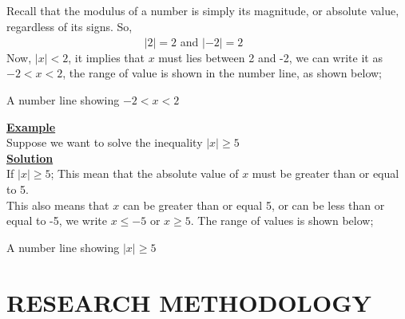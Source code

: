\documentclass[12pt]{report}
\newcommand{\ubt}[1]{\textbf{\underline{#1}}}
\newcommand{\NI}{\noindent}
\begin{document}
	\NI Recall that the modulus of a number is simply its magnitude, or absolute value, regardless of its signs. So,\\
		$\left.\right.\qquad\qquad\qquad\qquad\qquad\qquad$ $|2|=2$ and $|-2|=2$\\
		
	\NI Now, $|x|<2$, it implies that $x$ must lies between 2 and -2, we can write it as $-2<x<2$, the range of value is shown in the number line, as shown below;
	\begin{center}
		A number line showing $-2 < x < 2$\\
	\end{center}
	\ubt{Example}\\
	Suppose we want to solve the inequality $|x|\geq 5$\\
	
	\NI\ubt{Solution}\\
	If $|x| \geq 5$; This mean that the absolute value of $x$ must be greater than or equal to 5.\\
	
	\NI This also means that $x$ can be greater than or equal 5, or can be less than or equal to -5, we write $x\leq -5$ or $x\geq 5$. The range of values is shown below;
	\begin{center}
		A number line showing $|x| \geq 5$\\
	\end{center}
	
	
	\chapter{RESEARCH METHODOLOGY}
	
\end{document}
